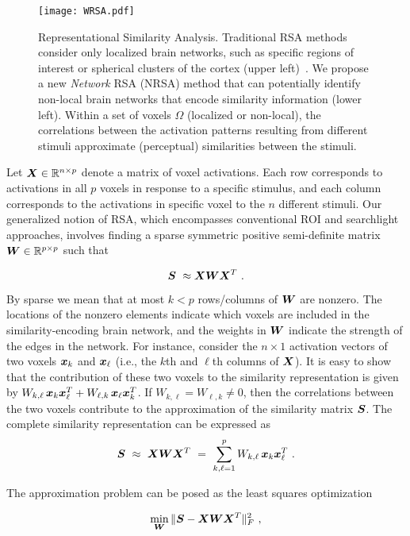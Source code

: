 \begin{figure}[!h]
	\centering
	          \texttt{[image: WRSA.pdf]}
	        
  \caption{Representational Similarity Analysis.  Traditional RSA methods consider only
    localized brain networks, such as specific regions of interest or spherical clusters
    of the cortex (upper left)~\cite{RSA,searchlight}.  We propose a new {\em Network} RSA
    (NRSA) method that can potentially identify non-local brain networks that encode
    similarity information (lower left).  Within a set of voxels $\Omega$ (localized or
    non-local), the correlations between the activation patterns resulting from different
    stimuli approximate (perceptual) similarities between the stimuli.  } \label{Fig:WRSA}
	\label{fig.fitting}
\end{figure}

Let $\boldsymbol{X} \in {\mathbb R}^{n\times p}$ denote a matrix of voxel activations.
Each row corresponds to activations in all $p$ voxels in response to a specific stimulus,
and each column corresponds to the activations in specific voxel to the $n$ different
stimuli.  Our generalized notion of RSA, which encompasses conventional ROI \cite{RSA} and
searchlight \cite{searchlight} approaches, involves finding a sparse symmetric positive
semi-definite matrix  $\boldsymbol{W}\in {\mathbb R}^{p\times p}$ such that

$$\bS \ \approx \bX \bW \bX^T \ .$$

By sparse we mean that at most $k<p$ rows/columns of $\boldsymbol{W}$ are nonzero. The locations of
the nonzero elements indicate which voxels are included in the similarity-encoding brain
network, and the weights in $\boldsymbol{W}$ indicate the strength of the edges in the network.  For
instance, consider the $n\times 1$ activation vectors of two voxels $\boldsymbol{x}_k$ and
$\boldsymbol{x}_{\ell}$ (i.e., the $k$th and $\ell$th columns of $\boldsymbol{X}$).  It is easy to show that the
contribution of these two voxels to the similarity representation is given by $ W_{k,\ell}
\, \boldsymbol{x}_k \boldsymbol{x}_{\ell}^T + W_{\ell,k} \, \boldsymbol{x}_\ell \boldsymbol{x}_{k}^T$.  If $W_{k,\ell}=W_{\ell,k}\neq
0$, then the correlations between the two voxels contribute to the approximation of the
similarity matrix $\boldsymbol{S}$. The complete similarity representation can be expressed as
$$\bS \ \approx \ \bX\bW\bX^T \ = \ \sum_{k,\ell=1}^p W_{k,\ell} \, \bx_k \bx_{\ell}^T  \ .$$

The approximation problem can be posed as the least squares optimization

$$\min_{\bW} \|\bS-\bX\bW\bX^T\|_F^2 \ , $$

